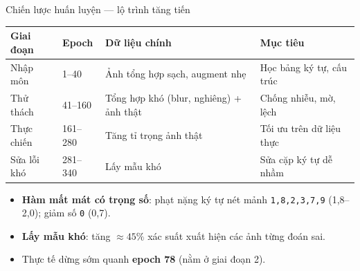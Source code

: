 \documentclass[aspectratio=169,9pt]{beamer}
\begin{document}
\begin{frame}{Chiến lược huấn luyện --- lộ trình tăng tiến}
\begin{table}\centering\footnotesize
\begin{tabular}{p{2.0cm}p{1.4cm}p{4.3cm}p{3.6cm}}
\toprule
\textbf{Giai đoạn} & \textbf{Epoch} & \textbf{Dữ liệu chính} & \textbf{Mục tiêu} \\
\midrule
Nhập môn & 1--40 & Ảnh tổng hợp sạch, augment nhẹ & Học bảng ký tự, cấu trúc \\
Thử thách & 41--160 & Tổng hợp khó (blur, nghiêng) + ảnh thật & Chống nhiễu, mờ, lệch \\
Thực chiến & 161--280 & Tăng tỉ trọng ảnh thật & Tối ưu trên dữ liệu thực \\
Sửa lỗi khó & 281--340 & Lấy mẫu khó & Sửa cặp ký tự dễ nhầm \\
\bottomrule
\end{tabular}
\end{table}
\begin{itemize}\footnotesize
  \item \textbf{Hàm mất mát có trọng số}: phạt nặng ký tự nét mảnh \texttt{1,8,2,3,7,9} (1,8--2,0); giảm số \texttt{0} (0,7).
  \item \textbf{Lấy mẫu khó}: tăng \(\approx45\%\) xác suất xuất hiện các ảnh từng đoán sai.
  \item Thực tế dừng sớm quanh \textbf{epoch 78} (nằm ở giai đoạn 2).
\end{itemize}
\end{frame}
\end{document}
